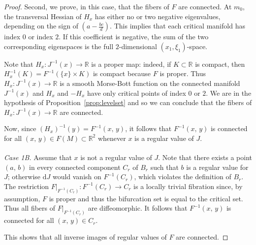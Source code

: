 \documentclass[11pt]{article}
\newcommand{\DD}{\mathrm{d}}
\begin{document}
\begin{proof}
  Second, we prove, in this case, that the fibers of $F$ are
  connected. At $m_0$, the transversal Hessian of $H_x$ has either no
  or two negative eigenvalues, depending on the sign of
  $(a-\frac{bc}{d})$. This implies that each critical manifold has
  index $0$ or index $2$. If this coefficient is negative, the sum of
  the two corresponding eigenspaces is the full $2$-dimensional
  $(x_1,\xi_1)$-space.
  
  Note that $H_x \colon J^{-1}(x) \to \mathbb{R}$ is a proper map:
  indeed, if $K \subset \mathbb{R}$ is compact, then
  $H_x^{-1}(K)=F^{-1}(\{x\} \times K)$ is compact because $F$ is
  proper. Thus $H_x \colon J^{-1}(x) \to \mathbb{R}$ is a smooth
  Morse-Bott function on the connected manifold $J^{-1}(x)$ and $H_x$
  and $-H_x$ have only critical points of index $0$ or $2$.  We are in
  the hypothesis of Proposition~\ref{prop:levelset} and so we can
  conclude that the fibers of $H_x \colon J^{-1}(x) \to \mathbb{R}$
  are connected.

  Now, since $(H_x)^{-1}(y)=F^{-1}(x,\,y)$, it follows that
  $F^{-1}(x,\,y)$ is connected for all $(x,\,y) \in F(M) \subset
  \mathbb{R}^2$ whenever $x$ is a regular value of $J$.
 \\
 \\
  \emph{Case 1B.} Assume that $x $ is not a regular value of
  $J$. Note that there exists a point $(a,\,b)$ in every connected
  component $C_r$ of $B_r$ such that $b$ is a regular value for $J$;
  otherwise $\DD J$ would vanish on $F^{-1}(C_r)$, which violates the
  definition of $B_r$.  The restriction $F|_{F^{-1}(C_r)} \colon
  F^{-1}(C_r) \to C_r$ is a locally trivial fibration since, by
  assumption, $F$ is proper and thus the bifurcation set is equal to
  the critical set. Thus all fibers of $F|_{F^{-1}(C_r)}$ are
  diffeomorphic. It follows that $F^{-1}(x,\,y)$ is connected for all
  $(x,\,y) \in C_r$.

  This shows that all inverse images of regular values of $F$ are
  connected.


\end{proof}
\end{document}
